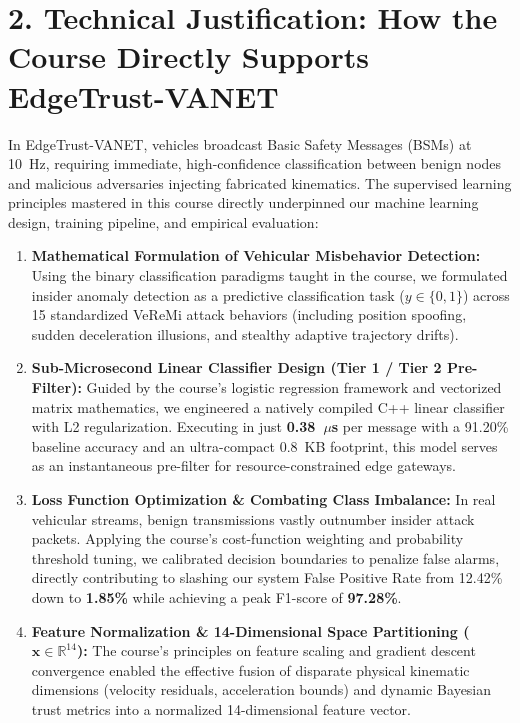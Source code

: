 \documentclass[10pt,a4paper]{article}
\begin{document}
\section*{2. Technical Justification: How the Course Directly Supports EdgeTrust-VANET}
In EdgeTrust-VANET, vehicles broadcast Basic Safety Messages (BSMs) at 10~Hz, requiring immediate, high-confidence classification between benign nodes and malicious adversaries injecting fabricated kinematics. The supervised learning principles mastered in this course directly underpinned our machine learning design, training pipeline, and empirical evaluation:

\begin{enumerate}
    \item \textbf{Mathematical Formulation of Vehicular Misbehavior Detection:} 
    Using the binary classification paradigms taught in the course, we formulated insider anomaly detection as a predictive classification task ($y \in \{0, 1\}$) across 15 standardized VeReMi attack behaviors (including position spoofing, sudden deceleration illusions, and stealthy adaptive trajectory drifts).

    \item \textbf{Sub-Microsecond Linear Classifier Design (Tier 1 / Tier 2 Pre-Filter):} 
    Guided by the course's logistic regression framework and vectorized matrix mathematics, we engineered a natively compiled C++ linear classifier with L2 regularization. Executing in just \textbf{0.38~$\mu$s} per message with a 91.20\% baseline accuracy and an ultra-compact 0.8~KB footprint, this model serves as an instantaneous pre-filter for resource-constrained edge gateways.

    \item \textbf{Loss Function Optimization \& Combating Class Imbalance:} 
    In real vehicular streams, benign transmissions vastly outnumber insider attack packets. Applying the course's cost-function weighting and probability threshold tuning, we calibrated decision boundaries to penalize false alarms, directly contributing to slashing our system False Positive Rate from 12.42\% down to \textbf{1.85\%} while achieving a peak F1-score of \textbf{97.28\%}.

    \item \textbf{Feature Normalization \& 14-Dimensional Space Partitioning ($\mathbf{x} \in \mathbb{R}^{14}$):} 
    The course's principles on feature scaling and gradient descent convergence enabled the effective fusion of disparate physical kinematic dimensions (velocity residuals, acceleration bounds) and dynamic Bayesian trust metrics into a normalized 14-dimensional feature vector.
\end{enumerate}
\end{document}
